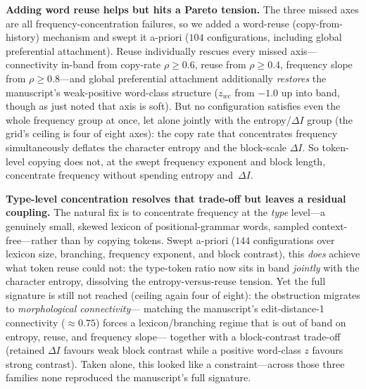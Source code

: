 \documentclass[11pt]{article}
\begin{document}
\textbf{Adding word reuse helps but hits a Pareto tension.} The three missed axes are all
frequency-concentration failures, so we added a word-reuse (copy-from-history) mechanism
and swept it a-priori ($104$ configurations, including global preferential attachment).
Reuse individually rescues every missed axis---connectivity in-band from copy-rate
$\rho\geq 0.6$, reuse from $\rho\geq 0.4$, frequency slope from $\rho\geq 0.8$---and
global preferential attachment additionally \emph{restores} the manuscript's weak-positive
word-class structure ($z_{wc}$ from $-1.0$ up into band, though as just noted that axis is
soft). But no configuration satisfies even the whole frequency group at once, let alone
jointly with the entropy/$\Delta I$ group (the grid's ceiling is four of eight axes): the
copy rate that concentrates frequency simultaneously deflates the character entropy and
the block-scale $\Delta I$. So token-level copying does not, at the swept frequency
exponent and block length, concentrate frequency without spending entropy and~$\Delta I$.

\textbf{Type-level concentration resolves that trade-off but leaves a residual coupling.}
The natural fix is to concentrate frequency at the \emph{type} level---a genuinely small,
skewed lexicon of positional-grammar words, sampled context-free---rather than by copying
tokens. Swept a-priori ($144$ configurations over lexicon size, branching, frequency
exponent, and block contrast), this \emph{does} achieve what token reuse could not: the
type-token ratio now sits in band \emph{jointly} with the character entropy, dissolving
the entropy-versus-reuse tension. Yet the full signature is still not reached (ceiling
again four of eight): the obstruction migrates to \emph{morphological connectivity}---
matching the manuscript's edit-distance-1 connectivity ($\approx 0.75$) forces a
lexicon/branching regime that is out of band on entropy, reuse, and frequency slope---
together with a block-contrast trade-off (retained $\Delta I$ favours weak block contrast
while a positive word-class $z$ favours strong contrast). Taken alone, this looked like a
constraint---across those three families none reproduced the manuscript's full signature.
\end{document}
